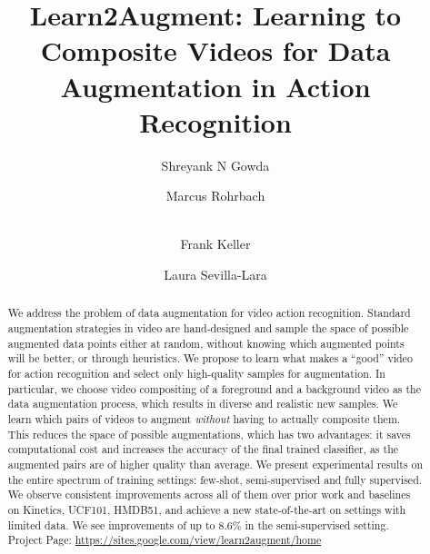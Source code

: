 \documentclass[runningheads]{llncs}
\begin{document}
\pagestyle{headings}
\mainmatter
\def\ECCVSubNumber{5234}  

\title{Learn2Augment: Learning to Composite Videos for Data Augmentation in Action Recognition} 

\begin{comment}
\titlerunning{ECCV-22 submission ID \ECCVSubNumber} 
\authorrunning{ECCV-22 submission ID \ECCVSubNumber} 
\author{Anonymous ECCV submission}
\institute{Paper ID \ECCVSubNumber}
\end{comment}


\author{Shreyank N Gowda \and
Marcus Rohrbach \and \\
Frank Keller  \and
Laura Sevilla-Lara}


\maketitle



\begin{abstract}
We address the problem of data augmentation for video action recognition. Standard augmentation strategies in video are hand-designed and sample the space of possible augmented data points either at random, without knowing which augmented points will be better, or through heuristics. We propose to learn what makes a ``good'' video for action recognition and select only high-quality samples for augmentation. In particular, we choose video compositing of a foreground and a background video as the data augmentation process, which results in diverse and realistic new samples. We learn which pairs of videos to augment {\em without} having to actually composite them. This reduces the space of possible augmentations, which has two advantages: it saves computational cost and increases the accuracy of the final trained classifier, as the augmented pairs are of higher quality than average. We present experimental results on the entire spectrum of training settings: few-shot, semi-supervised and fully supervised. We observe consistent improvements across all of them over prior work and baselines on Kinetics, UCF101, HMDB51, and achieve a new state-of-the-art on settings with limited data. We see improvements of up to 8.6\% in the semi-supervised setting. Project Page: \url{https://sites.google.com/view/learn2augment/home}
\end{abstract}
\end{document}
